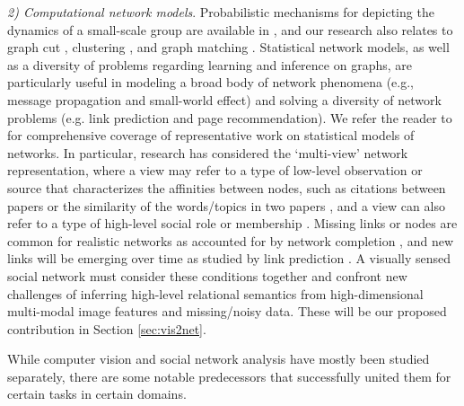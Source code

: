
\emph{2) Computational network models}. Probabilistic mechanisms for depicting the dynamics of a small-scale group are available in \cite{Basu:meeting,Dong,Choudhury:MHMM,Pan:influence}, and our research also relates to graph cut \cite{Ng:spectral,Boykov:segmentation}, clustering \cite{Filippone:clustering,Xu:clustering}, and graph matching \cite{West:Graph,Caetano:graph}. Statistical network models, as well as a diversity of problems regarding learning and inference on graphs, are particularly useful in modeling a broad body of network phenomena (e.g., message propagation and small-world effect) and solving a diversity of network problems (e.g. link prediction and page recommendation). We refer the reader to \cite{Goldenberg,Kolacyzk,Snijders,Rossi} for comprehensive coverage of representative work on statistical models of networks. In particular, research has considered the `multi-view' network representation, where a view may refer to a type of low-level observation or source that characterizes the affinities between nodes, such as citations between papers or the similarity of the words/topics in two papers \cite{ChangB09,WangMM05}, and a view can also refer to a type of high-level social role or membership \cite{AiroldiBFX08,Kim12}. Missing links or nodes are common for realistic networks as accounted for by network completion \cite{Clauset,Guimera,HannekeX09,KimL11}, and new links will be emerging over time as studied by link prediction \cite{Goldberg,Liben-Nowell,TaskarWAK03}. A visually sensed social network must consider these conditions together and confront new challenges of inferring high-level relational semantics from high-dimensional multi-modal image features and missing/noisy data. These will be our proposed contribution in Section \ref{sec:vis2net}.




While computer vision and social network analysis have mostly been studied separately, there are some notable predecessors that successfully united them for certain tasks in certain domains.

